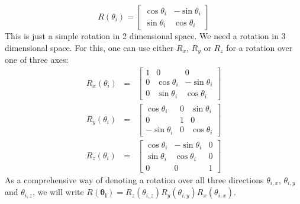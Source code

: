 \begin{equation*}
R(\theta_i) = 
\begin{bmatrix}
\cos\theta_i & -\sin\theta_i\\
\sin\theta_i & \cos\theta_i
\end{bmatrix}
\end{equation*}
This is just a simple rotation in 2 dimensional space. We need a rotation in 3
dimensional space.  For this, one can use either $R_x$, $R_y$ or $R_z$ for a
rotation over one of three axes:
\begin{eqnarray*}
R_x(\theta_i) &=&
\begin{bmatrix}
1 & 0 & 0 \\
0 & \cos\theta_i & -\sin\theta_i \\
0 & \sin\theta_i & \cos\theta_i
\end{bmatrix} \\
%
R_y(\theta_i) &=&
\begin{bmatrix}
\cos\theta_i & 0 & \sin\theta_i \\
0 & 1 & 0 \\
-\sin\theta_i & 0 & \cos\theta_i
\end{bmatrix} \\
%
R_z(\theta_i) &=&
\begin{bmatrix}
\cos\theta_i & -\sin\theta_i & 0 \\
\sin\theta_i & \cos\theta_i & 0 \\
0 & 0 & 1 
\end{bmatrix}
\end{eqnarray*}
%
As a comprehensive way of denoting a rotation over all three directions
$\theta_{i,x}$, $\theta_{i,y}$ and $\theta_{i,z}$, we will write
$R(\mathbf{\theta_i}) = R_z(\theta_{i,z}) R_y(\theta_{i,y}) R_x(\theta_{i,x})$.

